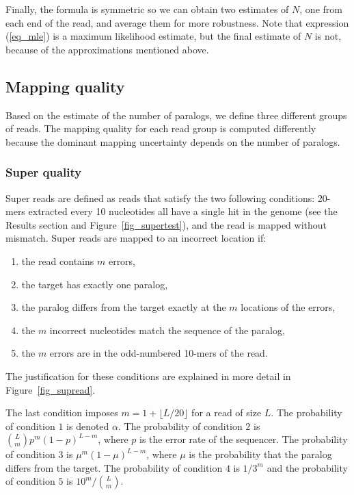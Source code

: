 \documentclass[english]{article}
\begin{document}
Finally, the formula is symmetric so we can obtain two estimates of $N$,
one from each end of the read, and average them for more robustness. Note
that expression (\ref{eq_mle}) is a maximum likelihood estimate, but the
final estimate of $N$ is not, because of the approximations mentioned
above.

\subsection{Mapping quality}

Based on the estimate of the number of paralogs, we define three
different groups of reads. The mapping quality for each read group
is computed differently because the dominant mapping uncertainty
depends on the number of paralogs.

\subsubsection{Super quality} Super reads are defined as reads that
satisfy the two following conditions: 20-mers extracted every 10
nucleotides all have a single hit in the genome (see the Results section
and Figure~\ref{fig_supertest}), and the read is mapped without mismatch.
Super reads are mapped to an incorrect location if:
\begin{enumerate}
  \item the read contains $m$ errors,
  \item the target has exactly one paralog,
  \item the paralog differs from the target exactly at the $m$ locations
    of the errors,
  \item the $m$ incorrect nucleotides match the sequence of the paralog,
  \item the $m$ errors are in the odd-numbered 10-mers of the read.
\end{enumerate}
The justification for these conditions are explained in more detail in
Figure~\ref{fig_supread}.

The last condition imposes $m = 1 + \lfloor L/20 \rfloor$ for a read of
size $L$. The probability of condition $1$ is denoted $\alpha$. The
probability of condition $2$ is ${L \choose m}p^m(1-p)^{L-m}$, where $p$
is the error rate of the sequencer. The probability of condition $3$
is $\mu^m(1-\mu)^{L-m}$, where $\mu$ is the probability that the paralog
differs from the target. The probability of condition $4$ is $1/3^m$ and
the probability of condition $5$ is $10^m/{L\choose m}$.
\end{document}
